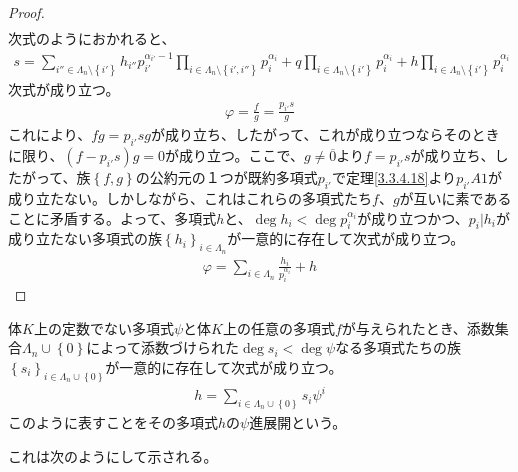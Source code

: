 \documentclass[dvipdfmx]{jsarticle}
\begin{document}
\begin{proof}
\begin{align*}
\end{align*}
次式のようにおかれると、
\begin{align*}
s = \sum_{i'' \in \varLambda_{n} \setminus \left\{ i' \right\}} {h_{i''}p_{i'}^{\alpha_{i'} - 1}\prod_{i \in \varLambda_{n} \setminus \left\{ i',i'' \right\}} p_{i}^{\alpha_{i}}} + q\prod_{i \in \varLambda_{n} \setminus \left\{ i' \right\}} p_{i}^{\alpha_{i}} + h\prod_{i \in \varLambda_{n} \setminus \left\{ i' \right\}} p_{i}^{\alpha_{i}}
\end{align*}
次式が成り立つ。
\begin{align*}
\varphi = \frac{f}{g} = \frac{p_{i'}s}{g}
\end{align*}
これにより、$fg = p_{i'}sg$が成り立ち、したがって、これが成り立つならそのときに限り、$\left( f - p_{i'}s \right)g = 0$が成り立つ。ここで、$g \neq \overline{0}$より$f = p_{i'}s$が成り立ち、したがって、族$\left\{ f,g \right\}$の公約元の１つが既約多項式$p_{i'}$で定理\ref{3.3.4.18}より$p_{i'}A1$が成り立たない。しかしながら、これはこれらの多項式たち$f$、$g$が互いに素であることに矛盾する。よって、多項式$h$と、$\deg h_{i} < \deg p_{i}^{\alpha_{i}}$が成り立つかつ、$p_{i}|h_{i}$が成り立たない多項式の族$\left\{ h_{i} \right\}_{i \in \varLambda_{n}}$が一意的に存在して次式が成り立つ。
\begin{align*}
\varphi = \sum_{i \in \varLambda_{n}} \frac{h_{i}}{p_{i}^{\alpha_{i}}} + h
\end{align*}
\end{proof}
\begin{thm}\label{3.3.4.24}
体$K$上の定数でない多項式$\psi$と体$K$上の任意の多項式$f$が与えられたとき、添数集合$\varLambda_{n} \cup \left\{ 0 \right\}$によって添数づけられた$\deg s_{i} < \deg\psi$なる多項式たちの族$\left\{ s_{i} \right\}_{i \in \varLambda_{n} \cup \left\{ 0 \right\}}$が一意的に存在して次式が成り立つ。
\begin{align*}
h = \sum_{i \in \varLambda_{n} \cup \left\{ 0 \right\}} {s_{i}\psi^{i}}
\end{align*}
このように表すことをその多項式$h$の$\psi$進展開という。
\end{thm}\par
これは次のようにして示される。
\end{document}
